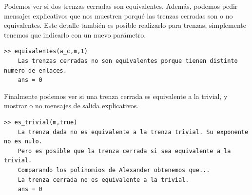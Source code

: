Podemos ver si dos trenzas cerradas son equivalentes. Además, podemos pedir mensajes explicativos que nos muestren porqué las trenzas cerradas son o no equivalentes. Este detalle también es posible realizarlo para trenzas, simplemente tenemos que indicarlo con un nuevo parámetro.  
\begin{lstlisting}
>> equivalentes(a_c,m,1)
	Las trenzas cerradas no son equivalentes porque tienen distinto numero de enlaces.
	ans = 0
\end{lstlisting}

Finalmente podemos ver si una trenza cerrada es equivalente a la trivial, y mostrar o no mensajes de salida explicativos.
\begin{lstlisting}
>> es_trivial(m,true)
	La trenza dada no es equivalente a la trenza trivial. Su exponente no es nulo.
	Pero es posible que la trenza cerrada si sea equivalente a la trivial.
	Comparando los polinomios de Alexander obtenemos que...
	La trenza cerrada no es equivalente a la trivial.
	ans = 0
\end{lstlisting}
